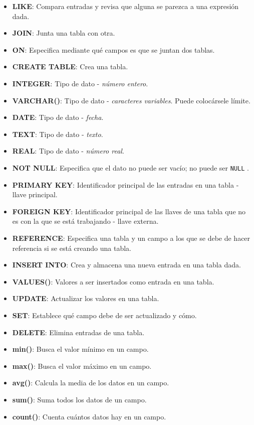 \documentclass[10pt,letterpaper]{article}
\newcommand{\inlinecode}[1]{
\colorbox{light-gray}{\texttt{#1}}
}
\begin{document}
\begin{small}
\begin{itemize}
\item \textbf{LIKE}: Compara entradas y revisa que alguna se parezca a una expresi\'on dada.
\item \textbf{JOIN}: Junta una tabla con otra.
\item \textbf{ON}: Especifica mediante qu\'e campos es que se juntan dos tablas.
\item \textbf{CREATE TABLE}: Crea una tabla.
\item \textbf{INTEGER}: Tipo de dato - \emph{n\'umero entero}.
\item \textbf{VARCHAR()}: Tipo de dato - \emph{caracteres variables}. Puede coloc\'arsele l\'imite.
\item \textbf{DATE}: Tipo de dato - \emph{fecha}.
\item \textbf{TEXT}: Tipo de dato - \emph{texto}.
\item \textbf{REAL}: Tipo de dato - \emph{n\'umero real}.
\item \textbf{NOT NULL}: Especifica que el dato no puede ser vac\'io; no puede ser \inlinecode{NULL}.
\item \textbf{PRIMARY KEY}: Identificador principal de las entradas en una tabla - llave principal.
\item \textbf{FOREIGN KEY}: Identificador principal de las llaves de una tabla que no es con la que se est\'a trabajando - llave externa.
\item \textbf{REFERENCE}: Especifica una tabla y un campo a los que se debe de hacer referencia si se est\'a creando una tabla.
\item \textbf{INSERT INTO}: Crea y almacena una nueva entrada en una tabla dada.
\item \textbf{VALUES()}: Valores a ser insertados como entrada en una tabla.
\item \textbf{UPDATE}: Actualizar los valores en una tabla.
\item \textbf{SET}: Establece qu\'e campo debe de ser actualizado y c\'omo.
\item \textbf{DELETE}: Elimina entradas de una tabla.
\item \textbf{min()}: Busca el valor m\'inimo en un campo.
\item \textbf{max()}: Busca el valor m\'aximo en un campo.
\item \textbf{avg()}: Calcula la media de los datos en un campo.
\item \textbf{sum()}: Suma todos los datos de un campo.
\item \textbf{count()}: Cuenta cu\'antos datos hay en un campo.
\end{itemize}
\end{small}
\end{document}
